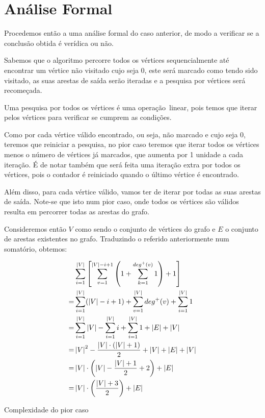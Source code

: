 \section{Análise Formal}

Procedemos então a uma análise formal do caso anterior, de modo a
verificar se a conclusão obtida é verídica ou não.

Sabemos que o algoritmo percorre todos os vértices sequencialmente até encontrar
um vértice não visitado cujo  seja 0, este será marcado como
tendo sido visitado, as suas arestas de saída serão iteradas e a pesquisa por
vértices será recomeçada.

Uma pesquisa por todos os vértices é uma operação linear, pois temos que iterar
pelos vértices para verificar se cumprem as condições.

Como por cada vértice válido encontrado, ou seja, não marcado e cujo
 seja 0, teremos que reiniciar a pesquisa, no pior caso
teremos que iterar todos os vértices menos o número de vértices já marcados,
que aumenta por 1 unidade a cada iteração. É de notar também que será feita
uma iteração extra por todos os vértices, pois o contador é reiniciado
quando o último vértice é encontrado.

Além disso, para cada vértice válido, vamos ter de iterar por todas as suas
arestas de saída. Note-se que isto num pior caso, onde todos os vértices são
válidos resulta em percorrer todas as arestas do grafo.

Consideremos então $V$ como sendo o conjunto de vértices do grafo e $E$ o
conjunto de arestas existentes no grafo. Traduzindo o referido anteriormente num
somatório, obtemos:

\begin{formula}[H]
	\begin{align}
		  & \sum_{i = 1}^{\left\lvert V \right\rvert} \left[
		\sum_{v=1}^{\left\lvert V \right\rvert - i + 1} \left( 1 + \sum_{k=1}^{deg^+(v)} 1 \right) + 1
		\right]                                                             \\
		= & \sum_{i = 1}^{\left\lvert V \right\rvert} (\left\lvert V \right\rvert - i + 1)
		+ \sum_{v=1}^{\left\lvert V \right\rvert} deg^+(v) + \sum_{i = 1}^{\left\lvert V \right\rvert} 1        \\
		= & \sum_{i=1}^{\left\lvert V \right\rvert} \left\lvert V \right\rvert - \sum_{i=1}^{\left\lvert V \right\rvert} i
		+ \sum_{i=1}^{\left\lvert V \right\rvert} 1 + \left\lvert E \right\rvert + \left\lvert V \right\rvert                     \\
		= & \left\lvert V \right\rvert^2 - \frac{\left\lvert V \right\rvert \cdot (\left\lvert V \right\rvert + 1)}{2} + \left\lvert V \right\rvert
		+ \left\lvert E \right\rvert + \left\lvert V \right\rvert                                               \\
		= & \left\lvert V \right\rvert \cdot \left(
		\left\lvert V \right\rvert - \frac{\left\lvert V \right\rvert + 1}{2} + 2
		\right) + \left\lvert E \right\rvert                                                  \\
		= & \left\lvert V \right\rvert \cdot \left( \frac{\left\lvert V \right\rvert + 3}{2} \right) + \left\lvert E \right\rvert
	\end{align}
	\caption{Complexidade do pior caso}
\end{formula}

